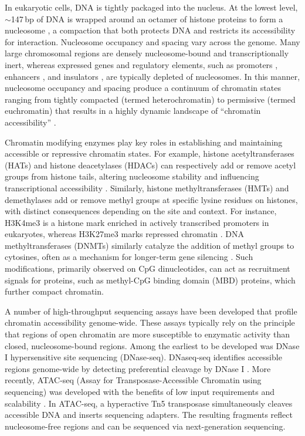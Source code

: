 \begin{dissertationintroduction}
In eukaryotic cells, DNA is tightly packaged into the nucleus. At the lowest level, $\sim$147\,bp of DNA is wrapped around an octamer of histone proteins to form a nucleosome \cite{Klemm2019-iv}, a compaction that both protects DNA and restricts its accessibility for interaction. Nucleosome occupancy and spacing vary across the genome. Many large chromosomal regions are densely nucleosome-bound and transcriptionally inert, whereas expressed genes and regulatory elements, such as promoters \cite{Hartley2009-ab}, enhancers \cite{Levine2010-ry}, and insulators \cite{West2002-tz}, are typically depleted of nucleosomes. In this manner, nucleosome occupancy and spacing produce a continuum of chromatin states ranging from tightly compacted (termed heterochromatin) to permissive (termed euchromatin) \cite{Klemm2019-iv} that results in a highly dynamic landscape of “chromatin accessibility” \cite{Meuleman2020-cc}.

Chromatin modifying enzymes play key roles in establishing and maintaining accessible or repressive chromatin states. For example, histone acetyltransferases (HATs) and histone deacetylases (HDACs) can respectively add or remove acetyl groups from histone tails, altering nucleosome stability and influencing transcriptional accessibility \cite{Eberharter2002-hm}. Similarly, histone methyltransferases (HMTs) and demethylases add or remove methyl groups at specific lysine residues on histones, with distinct consequences depending on the site and context. For instance, H3K4me3 is a histone mark enriched in actively transcribed promoters in eukaryotes, whereas H3K27me3 marks repressed chromatin \cite{Millan-Zambrano2022-pr}. DNA methyltransferases (DNMTs) similarly catalyze the addition of methyl groups to cytosines, often as a mechanism for longer-term gene silencing \cite{Moore2013-gr}. Such modifications, primarily observed on CpG dinucleotides, can act as recruitment signals for proteins, such as methyl-CpG binding domain (MBD) proteins, which further compact chromatin.

A number of high-throughput sequencing assays have been developed that profile chromatin accessibility genome-wide. These assays typically rely on the principle that regions of open chromatin are more susceptible to enzymatic activity than closed, nucleosome-bound regions. Among the earliest to be developed was DNase I hypersensitive site sequencing (DNase-seq). DNaseq-seq identifies accessible regions genome-wide by detecting preferential cleavage by DNase I \cite{Song2010-nn}. More recently, ATAC-seq (Assay for Transposase-Accessible Chromatin using sequencing) was developed with the benefits of low input requirements and scalability \cite{Buenrostro2013-lj}. In ATAC-seq, a hyperactive Tn5 transposase simultaneously cleaves accessible DNA and inserts sequencing adapters. The resulting fragments reflect nucleosome-free regions and can be sequenced via next-generation sequencing.


\end{dissertationintroduction}
